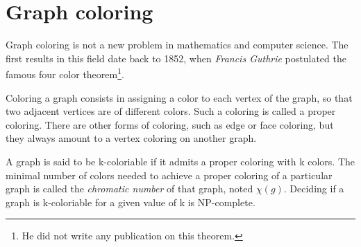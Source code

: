\section{Graph coloring}

Graph coloring is not a new problem in mathematics and computer science. The first results in this field date back to 1852, when \emph{Francis Guthrie} postulated the famous four color theorem\footnote{He did not write any publication on this theorem.}.

Coloring a graph consists in assigning a color to each vertex of the graph, so that two adjacent vertices are of different colors. Such a coloring is called a proper coloring. There are other forms of coloring, such as edge or face coloring, but they always amount to a vertex coloring on another graph.

A graph is said to be k-coloriable if it admits a proper coloring with k colors. The minimal number of colors needed to achieve a proper coloring of a particular graph is called the \textit{chromatic number} of that graph, noted $ \chi (g)$. Deciding if a graph is k-coloriable for a given value of k is NP-complete.
